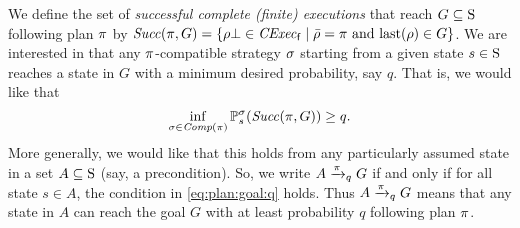 
      
  


We define the set of \emph{successful complete (finite) executions}
that reach $G\subseteq\S$ following plan $\plan$ by
$\Succ(\plan,G)=\{{\rho\complete\in\cexecf}\mid{\bar{\rho}=\plan
  \text{ and } \last(\rho)\in G}\}$.
%
We are interested in that any $\plan$-compatible strategy $\strat$
starting from a given state $s\in\S$ reaches a state in $G$ with a
minimum desired probability, say $q$.  That is, we would like that
%
\begin{equation}\label{eq:plan:goal:q}
  \inf_{\strat \in\Comp(\plan)}\Prob^\strat_s(\Succ(\plan,G)) \geq q.
\end{equation}
%
More generally, we would like that this holds from any particularly
assumed state in a set $A\subseteq\S$ (say, a precondition).  So, we
write $A \reach{\plan}_q G$ if and only if for all state $s\in A$,
the condition in \cref{eq:plan:goal:q} holds.
%
Thus $A \reach{\plan}_q G$ means that any state in $A$ can reach the
goal $G$ with at least probability $q$ following plan $\plan$.


